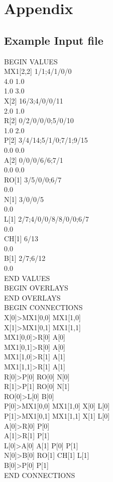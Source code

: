 \documentclass[12pt,a4paper]{article}
\begin{document}
\section{Appendix}
\subsection{Example Input file}
BEGIN VALUES\\
MX1[2,2] 1/1;4/1/0/0\\
4.0 1.0\\
1.0 3.0\\
X[2] 16/3;4/0/0/11\\
2.0 1.0\\
R[2] 0/2/0/0/0;5/0/10\\
1.0 2.0\\
P[2] 3/4/14;5/1/0;7/1;9/15\\
0.0 0.0\\
A[2] 0/0/0/6/6;7/1\\
0.0 0.0\\
RO[1] 3/5/0/0;6/7\\
0.0\\
N[1] 3/0/0/5\\
0.0\\
L[1] 2/7;4/0/0/8/8/0/0;6/7\\
0.0\\
CH[1] 6/13\\
0.0\\
B[1] 2/7;6/12\\
0.0\\
END VALUES\\
BEGIN OVERLAYS\\
END OVERLAYS\\
BEGIN CONNECTIONS\\
X[0]>MX1[0,0] MX1[1,0]\\
X[1]>MX1[0,1] MX1[1,1]\\
MX1[0,0]>R[0] A[0]\\
MX1[0,1]>R[0] A[0]\\
MX1[1,0]>R[1] A[1]\\
MX1[1,1]>R[1] A[1]\\
R[0]>P[0] RO[0] N[0]\\
R[1]>P[1] RO[0] N[1]\\
RO[0]>L[0] B[0]\\
P[0]>MX1[0,0] MX1[1,0] X[0] L[0]\\
P[1]>MX1[0,1] MX1[1,1] X[1] L[0]\\
A[0]>R[0] P[0]\\
A[1]>R[1] P[1]\\
L[0]>A[0] A[1] P[0] P[1]\\
N[0]>B[0] RO[1] CH[1] L[1]\\
B[0]>P[0] P[1]\\
END CONNECTIONS\\
\end{document}
